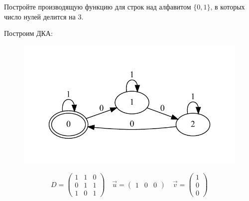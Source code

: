 


\section{}
Постройте производящую функцию для строк над алфавитом $\{0, 1\}$, в которых число нулей делится на 3.

Построим ДКА:
\begin{figure}[h]
    \includegraphics[scale=0.7]{images/73.pdf}
\end{figure}

\[D = \begin{pmatrix} 1 & 1 & 0 \\ 0 & 1 & 1 \\ 1 & 0 & 1 \end{pmatrix} \quad \vec{u} = \begin{pmatrix} 1 & 0 & 0 \end{pmatrix} \quad \vec{v} = \begin{pmatrix} 1 \\ 0 \\ 0 \end{pmatrix}\]

